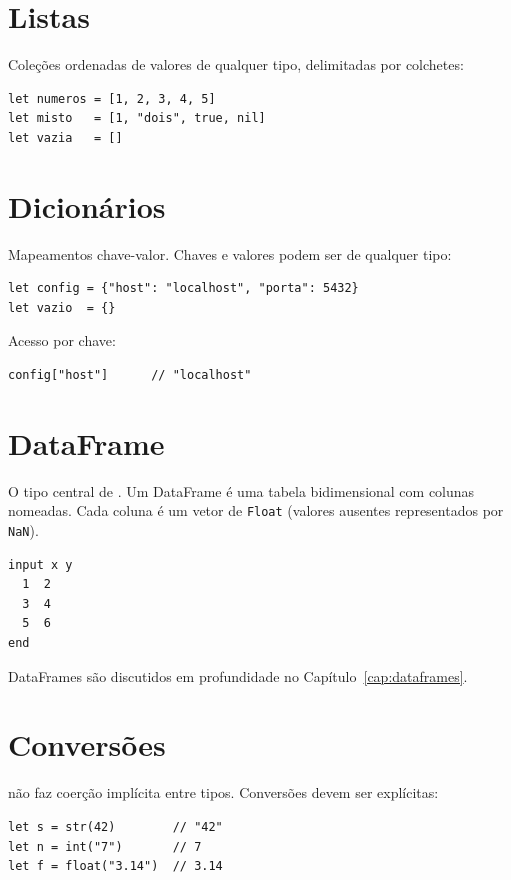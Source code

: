 \section{Listas}

Coleções ordenadas de valores de qualquer tipo, delimitadas por colchetes:

\begin{lstlisting}
let numeros = [1, 2, 3, 4, 5]
let misto   = [1, "dois", true, nil]
let vazia   = []
\end{lstlisting}

\section{Dicionários}

Mapeamentos chave-valor. Chaves e valores podem ser de qualquer tipo:

\begin{lstlisting}
let config = {"host": "localhost", "porta": 5432}
let vazio  = {}
\end{lstlisting}

Acesso por chave:

\begin{lstlisting}
config["host"]      // "localhost"
\end{lstlisting}

\section{DataFrame}

O tipo central de \hayashi{}. Um DataFrame é uma tabela bidimensional com colunas
nomeadas. Cada coluna é um vetor de \texttt{Float} (valores ausentes representados
por \texttt{NaN}).

\begin{lstlisting}[caption={Criando um DataFrame inline}]
input x y
  1  2
  3  4
  5  6
end
\end{lstlisting}

DataFrames são discutidos em profundidade no Capítulo~\ref{cap:dataframes}.

\section{Conversões}

\hayashi{} não faz coerção implícita entre tipos. Conversões devem ser explícitas:

\begin{lstlisting}
let s = str(42)        // "42"
let n = int("7")       // 7
let f = float("3.14")  // 3.14
\end{lstlisting}

